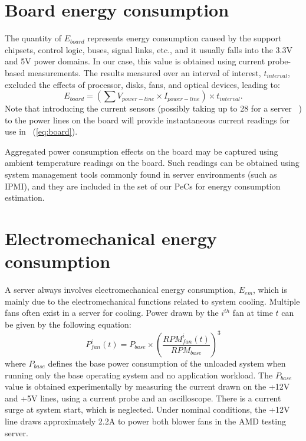 \section{Board energy consumption}
\label{sec:board}
The quantity of $E_{board}$ represents energy consumption caused by the
support chipsets, control logic, buses, signal links, etc.,
and it usually falls into the 3.3V and 5V power domains.
In our case, this value is obtained using current probe-based measurements.
The results measured over an interval of interest, $t_{interval}$,
excluded the effects of processor, disks, fans, and optical devices, leading to:
\begin{equation}
\label{eq:board}
E_{board} = \left(\sum V_{power-line}\times I_{power-line}\right) \times t_{interval}.
\end{equation}
Note that introducing the current sensors (possibly taking up to 28 for
a server ~\cite{SSI2004}) to the power lines on the board will provide
instantaneous current readings for use in \equationname~(\ref{eq:board}).

Aggregated power consumption effects on the board may be captured using
ambient temperature readings on the board.  Such readings can be
obtained using system management tools commonly found in server
environments (such as IPMI), and they are included in the set of our PeCs
for energy consumption estimation.
\section{Electromechanical energy consumption}
\label{sec:electrical}
A server always involves electromechanical energy consumption, $E_{em}$,
which is mainly due to the electromechanical functions related to system
cooling.  Multiple fans often exist in a server for cooling.  Power
drawn by the $i^{th}$ fan at time $t$ can be given by the following
equation:
\begin{equation}
\label{eq:fanp}
P_{fan}^{i}(t) = P_{base} \times \left(\frac{RPM_{fan}^{i}(t)}{RPM_{base}}\right)^3
\end{equation} 
where $P_{base}$ defines the base power consumption of the unloaded system
when running only the base operating system and no application workload.
The $P_{base}$ value is obtained experimentally by measuring the current drawn
on the +12V and +5V lines, using a current probe and an oscilloscope.
There is a current surge at system start, which is neglected.
Under nominal conditions, the +12V line draws approximately 2.2A
to power both blower fans in the AMD testing server.

